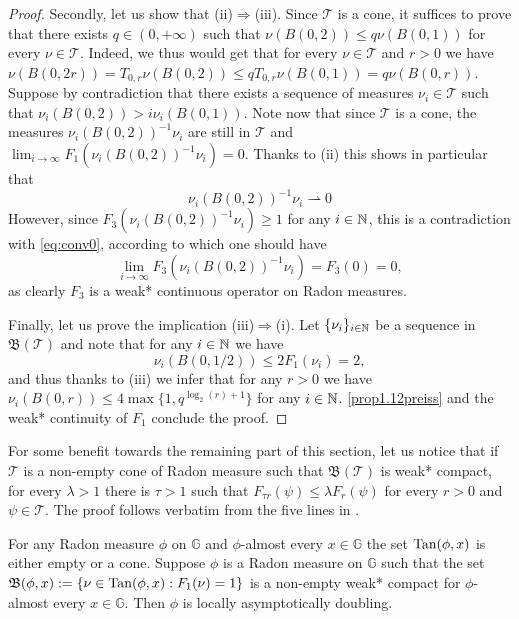 \documentclass[10pt, a4paper,
oneside, headinclude,footinclude]{scrartcl}
\begin{document}
\begin{proof}
 Secondly, let us show that (ii)$\Rightarrow$(iii). Since $\mathcal{T}$ is a cone, it suffices to prove that there exists $q\in(0,+\infty)$ such that $\nu(B(0,2))\leq q\nu (B(0,1))$ for every $\nu\in\mathcal{T}$. Indeed, we thus would get that for every $\nu\in\mathcal{T}$ and $r>0$ we have $\nu(B(0,2r))=T_{0,r}\nu(B(0,2))\leq qT_{0,r}\nu(B(0,1))=q\nu(B(0,r))$. Suppose by contradiction that there exists a sequence of measures $\nu_i\in \mathcal{T}$ such that $\nu_i(B(0,2))>i\nu_i(B(0,1))$. Note now that since $\mathcal{T}$ is a cone, the measures $\nu_i(B(0,2))^{-1}\nu_i$ are still in $\mathcal{T}$ and $\lim_{i\to \infty} F_1(\nu_i(B(0,2))^{-1}\nu_i)=0$. Thanks to (ii) this shows in particular that 
 \begin{equation}
 \nu_i(B(0,2))^{-1}\nu_i\rightharpoonup0     
     \label{eq:conv0}
 \end{equation}
 However, since $ F_3(\nu_i(B(0,2))^{-1}\nu_i)\geq 1$ for any $i\in \mathbb{N}$, this is a contradiction with \eqref{eq:conv0}, according to which one should have
 $$\lim_{i\to\infty} F_3(\nu_i(B(0,2))^{-1}\nu_i)=F_3(0)=0,$$
 as clearly $F_3$ is a weak* continuous operator on Radon measures.
 
 Finally, let us prove the implication (iii)$\Rightarrow$(i). Let $\{\nu_i\}_{i\in\mathbb{N}}$ be a sequence in $\mathfrak{B}(\mathcal{T})$ and note that for any $i\in\mathbb{N}$ we have
 $$\nu_i(B(0,1/2))\leq 2F_1(\nu_i)=2,$$
 and thus thanks to (iii) we infer that for any $r>0$ we have $\nu_i(B(0,r))\leq 4\max\{1,q^{\log_2(r)+1}\}$ for any $i\in\mathbb{N}$. \cref{prop1.12preiss} and the weak* continuity of $F_1$ conclude the proof.
\end{proof}
\begin{osservazione}\label{rem:LambdaCones}
For some benefit towards the remaining part of this section, let us notice that if $\mathcal{T}$ is a non-empty cone of Radon measure such that $\mathfrak B(\mathcal{T})$ is weak* compact, for every $\lambda>1$ there is $\tau>1$ such that $F_{\tau r}(\psi)\leq \lambda F_r(\psi)$ for every $r>0$ and $\psi\in\mathcal{T}$. The proof follows verbatim from the five lines in \cite[(1)$\Rightarrow$(5) of Proposition 2.2]{Preiss1987GeometryDensities}.
\end{osservazione}

\begin{proposizione}\label{prop:PhiAsDoubling}
For any Radon measure $\phi$ on $\mathbb{G}$ and $\phi$-almost every $x\in\mathbb{G}$ the set $\mathrm{Tan}(\phi,x)$ is either empty or a cone.
Suppose $\phi$ is a Radon measure on $\mathbb{G}$ such that the set $\mathfrak{B}(\phi,x):=\{\nu\in\mathrm{Tan}(\phi,x):F_1(\nu)=1\}$
is a non-empty weak* compact for $\phi$-almost every $x\in\mathbb{G}$. Then $\phi$ is locally asymptotically doubling.
\end{proposizione}
\end{document}
